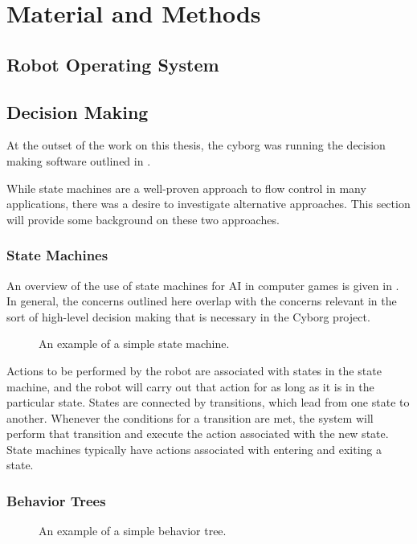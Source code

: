 \documentclass[\rootfolder/main.tex]{subfiles}
\begin{document}
\chapter{Material and Methods} %

\label{ch:matmet} %

\section{Robot Operating System}

\section{Decision Making}

At the outset of the work on this thesis, the cyborg was running the decision making software outlined in \cite{Andersen2017}.

While state machines are a well-proven approach to flow control in many applications, there was a desire to investigate alternative approaches.
This section will provide some background on these two approaches.

\subsection{State Machines} \label{sec:statemachines}

An overview of the use of state machines for AI in computer games is given in \cite{Millington2009}.
In general, the concerns outlined here overlap with the concerns relevant in the sort of high-level decision making that is necessary in the Cyborg project.

\begin{wrapfigure}{R}{0.5\columnwidth}
    \caption{An example of a simple state machine.}
\end{wrapfigure}

Actions to be performed by the robot are associated with states in the state machine, and the robot will carry out that action for as long as it is in the particular state.
States are connected by transitions, which lead from one state to another.
Whenever the conditions for a transition are met, the system will perform that transition and execute the action associated with the new state.
State machines typically have actions associated with entering and exiting a state.

\subsection{Behavior Trees} \label{sec:behaviortrees}

\begin{wrapfigure}{L}{0.5\columnwidth}
    \caption{An example of a simple behavior tree.}
\end{wrapfigure}
\end{document}

